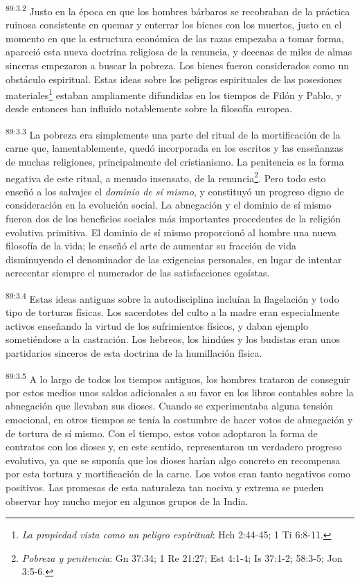 \par
\textsuperscript{89:3.2} Justo en la época en que los hombres bárbaros se recobraban de la práctica ruinosa consistente en quemar y enterrar los bienes con los muertos, justo en el momento en que la estructura económica de las razas empezaba a tomar forma, apareció esta nueva doctrina religiosa de la renuncia, y decenas de miles de almas sinceras empezaron a buscar la pobreza. Los bienes fueron considerados como un obstáculo espiritual. Estas ideas sobre los peligros espirituales de las posesiones materiales\footnote{\textit{La propiedad vista como un peligro espiritual}: Hch 2:44-45; 1 Ti 6:8-11.} estaban ampliamente difundidas en los tiempos de Filón y Pablo, y desde entonces han influido notablemente sobre la filosofía europea.

\par
\textsuperscript{89:3.3} La pobreza era simplemente una parte del ritual de la mortificación de la carne que, lamentablemente, quedó incorporada en los escritos y las enseñanzas de muchas religiones, principalmente del cristianismo. La penitencia es la forma negativa de este ritual, a menudo insensato, de la renuncia\footnote{\textit{Pobreza y penitencia}: Gn 37:34; 1 Re 21:27; Est 4:1-4; Is 37:1-2; 58:3-5; Jon 3:5-6.}. Pero todo esto enseñó a los salvajes el \textit{dominio de sí mismo}, y constituyó un progreso digno de consideración en la evolución social. La abnegación y el dominio de sí mismo fueron dos de los beneficios sociales más importantes procedentes de la religión evolutiva primitiva. El dominio de sí mismo proporcionó al hombre una nueva filosofía de la vida; le enseñó el arte de aumentar su fracción de vida disminuyendo el denominador de las exigencias personales, en lugar de intentar acrecentar siempre el numerador de las satisfacciones egoístas.

\par
\textsuperscript{89:3.4} Estas ideas antiguas sobre la autodisciplina incluían la flagelación y todo tipo de torturas físicas. Los sacerdotes del culto a la madre eran especialmente activos enseñando la virtud de los sufrimientos físicos, y daban ejemplo sometiéndose a la castración. Los hebreos, los hindúes y los budistas eran unos partidarios sinceros de esta doctrina de la humillación física.

\par
\textsuperscript{89:3.5} A lo largo de todos los tiempos antiguos, los hombres trataron de conseguir por estos medios unos saldos adicionales a su favor en los libros contables sobre la abnegación que llevaban sus dioses. Cuando se experimentaba alguna tensión emocional, en otros tiempos se tenía la costumbre de hacer votos de abnegación y de tortura de sí mismo. Con el tiempo, estos votos adoptaron la forma de contratos con los dioses y, en este sentido, representaron un verdadero progreso evolutivo, ya que se suponía que los dioses harían algo concreto en recompensa por esta tortura y mortificación de la carne. Los votos eran tanto negativos como positivos. Las promesas de esta naturaleza tan nociva y extrema se pueden observar hoy mucho mejor en algunos grupos de la India.

